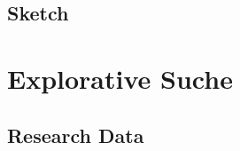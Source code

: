 \documentclass[a4paper, 11pt, accentcolor = tud3b]{tudreport}
\begin{document}
			\subsection{Sketch} %

		\section{Explorative Suche} %

			\subsection{Research Data} %
\end{document}
